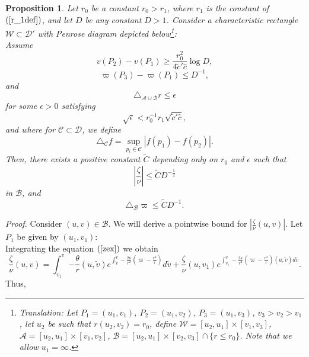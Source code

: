 \documentclass{article}
\newtheorem{proposition}{Proposition}[section]
\newcommand{\zn}{\frac{\zeta}{\nu}}
\begin{document}
\begin{proposition}
\label{aptovoriz}
Let $r_0$ be a constant $r_0> r_1$, where $r_1$ is the constant of
$(\ref{r_1def})$,
and let $D$ be any constant $D>1$. 
Consider a characteristic rectangle $\mathcal{W}\subset\mathcal{D}'$ with Penrose
diagram depicted below\footnote{Translation: Let $P_1=(u_1,v_1)$, $P_2=(u_1,v_2)$,
$P_3=(u_1,v_3)$, $v_3>v_2>v_1$, let
$u_2$ be such that $r(u_2,v_2)=r_0$, define $\mathcal{W}=[u_2,u_1]
\times[v_1,v_3]$, $\mathcal{A}=[u_2,u_1]\times[v_1,v_2]$, $\mathcal{B}
=[u_2,u_1]\times [v_2,v_3]\cap \{r\le r_0\}$. Note that we allow $u_1=\infty$.}:
\[

\]
Assume 
\begin{equation}
\label{mnkos}
v(P_2)-v(P_1)\ge \frac{r_0^2}{4\tilde{c}'\hat{c}}\log D,
\end{equation}
\begin{equation}
\label{stageg}
\varpi(P_3)-\varpi(P_1)\le D^{-1},
\end{equation} 
and
\begin{equation}
\label{metoe}
\triangle_{\mathcal{A}\cup\mathcal{B}} r\le\epsilon
\end{equation}
for some $\epsilon>0$ satisfying
\begin{equation}
\label{epsepil}
\sqrt{\epsilon}<r_0^{-1}r_1\sqrt{\tilde{c}'\hat{c}},
\end{equation}
and
where for $\mathcal{C}\subset\mathcal{D}$,
we define 
\[
\triangle_{\mathcal{C}} f=\sup_{p_i\in\mathcal{C}}{|f(p_1)-f(p_2)|}.
\]
Then, there exists a positive constant
$\tilde{C}$ depending only on $r_0$ and $\epsilon$ such that
\begin{equation}
\label{apot1}
\left|\zn\right|\le \tilde{C}D^{-\frac12}
\end{equation}
in $\mathcal{B}$,
and
\begin{equation}
\label{apot2}
\triangle_{\mathcal{B}} \varpi\le \tilde{C}D^{-1}.
\end{equation}
\end{proposition}
\noindent\emph{Proof.} 
Consider $(u,v)\in\mathcal{B}$.
We will derive a pointwise bound for $\left|\zn(u,v)\right|$.
Let $P_1$ be given by $(u_1,v_1)$:
\[

\]
Integrating the equation $(\ref{zex})$
we obtain
\[
\zn(u,v)=
\int_{v_1}^v{-\frac{\theta}r(u,\tilde{v})e^{\int_{\tilde{v}}^v
-\frac{2\kappa}{r^2}\left(
\varpi-\frac{e^2}r\right)}d\tilde{v}}
+\zn(u,v_1)e^{\int_{v_1}^v
-\frac{2\kappa}{r^2}\left(
\varpi-\frac{e^2}r\right)(u,\tilde{v})d\tilde{v}}.
\]
Thus,
\end{document}
